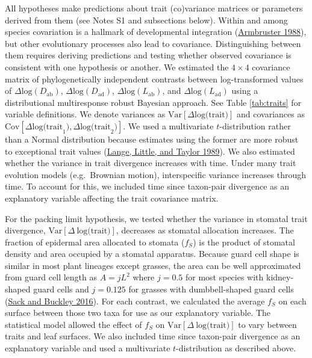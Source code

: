 \documentclass[
  12pt,
]{article}
\begin{document}
All hypotheses make predictions about trait (co)variance matrices or parameters derived from them (see Notes S1 and subsections below). Within and among species covariation is a hallmark of developmental integration (\protect\hyperlink{ref-armbruster_multilevel_1988}{Armbruster 1988}), but other evolutionary processes also lead to covariance. Distinguishing between them requires deriving predictions and testing whether observed covariance is consistent with one hypothesis or another. We estimated the \(4 \times 4\) covariance matrix of phylogenetically independent contrasts between log-transformed values of \(\Delta \text{log}(D_\mathrm{ab})\), \(\Delta \text{log}(D_\mathrm{ad})\), \(\Delta \text{log}(L_\mathrm{ab})\), and \(\Delta \text{log}(L_\mathrm{ad})\) using a distributional multiresponse robust Bayesian approach. See Table \ref{tab:traits} for variable definitions. We denote variances as \(\text{Var}[\Delta \text{log(trait)}]\) and covariances as \(\text{Cov}[\Delta \text{log(trait}_1),\Delta \text{log(trait}_2)]\). We used a multivariate \(t\)-distribution rather than a Normal distribution because estimates using the former are more robust to exceptional trait values (\protect\hyperlink{ref-lange_robust_1989}{Lange, Little, and Taylor 1989}). We also estimated whether the variance in trait divergence increases with time. Under many trait evolution models (e.g.~Brownian motion), interspecific variance increases through time. To account for this, we included time since taxon-pair divergence as an explanatory variable affecting the trait covariance matrix.

For the packing limit hypothesis, we tested whether the variance in stomatal trait divergence, \(\textrm{Var}[\Delta~\textrm{log(trait)}]\), decreases as stomatal allocation increases. The fraction of epidermal area allocated to stomata (\(f_S\)) is the product of stomatal density and area occupied by a stomatal apparatus. Because guard cell shape is similar in most plant lineages except grasses, the area can be well approximated from guard cell length as \(A = j L ^ 2\) where \(j = 0.5\) for most species with kidney-shaped guard cells and \(j = 0.125\) for grasses with dumbbell-shaped guard cells (\protect\hyperlink{ref-sack_developmental_2016}{Sack and Buckley 2016}). For each contrast, we calculated the average \(f_S\) on each surface between those two taxa for use as our explanatory variable. The statistical model allowed the effect of \(f_S\) on \(\textrm{Var}[\Delta~\textrm{log(trait)}]\) to vary between traits and leaf surfaces. We also included time since taxon-pair divergence as an explanatory variable and used a multivariate \(t\)-distribution as described above.
\end{document}
